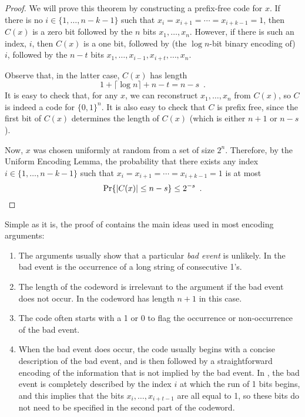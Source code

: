 \documentclass[lotsofwhite]{patmorin}
\begin{document}
\begin{proof}
  We will prove this theorem by constructing a prefix-free code
  for $x$. If there is no $i\in\{1,\ldots,n-k-1\}$ such that
  $x_i=x_{i+1}=\cdots=x_{i+k-1}=1$, then $C(x)$ is a zero bit
  followed by the $n$ bits $x_1,\ldots,x_n$.  However, if there is
  such an index, $i$, then $C(x)$ is a one bit, followed by (the
  $\log n$-bit binary encoding of) $i$, followed by the $n-t$ bits
  $x_1,\ldots,x_{i-1},x_{i+t},\ldots,x_n$.

  Observe that, in the latter case, $C(x)$ has length 
  \[
      1 + \lceil\log n\rceil + n - t = n-s \enspace .
  \]
  It is easy to check that, for any $x$, we can reconstruct
  $x_1,\ldots,x_n$ from $C(x)$, so $C$ is indeed a code for $\{0,1\}^n$.
  It is also easy to check that $C$ is prefix free, since the first bit of
  $C(x)$ determines the length of $C(x)$ (which is either $n+1$ or $n-s$).

  Now, $x$ was chosen uniformly at random from a set of size $2^{n}$.
  Therefore, by the Uniform Encoding Lemma, the probability
  that there exists any index $i\in\{1,\ldots,n-k-1\}$ such that
  $x_i=x_{i+1}=\cdots=x_{i+k-1}=1$ is at most
  \[
      \Pr\{|C(x)|\le n-s\} \le 2^{-s} \enspace . \qedhere 
  \]
\end{proof}

Simple as it is, the proof of  contains the main ideas
used in most encoding arguments:

\begin{enumerate}
  \item The arguments usually show that a particular \emph{bad event}
  is unlikely.  In  the bad event is the occurrence of a long
  string of consecutive 1's.

  \item The length of the codeword is irrelevant to the argument if
  the bad event does not occur.  In 
  the codeword has length $n+1$ in this case.
 
  \item The code often starts with a 1 or 0 to flag the occurrence or
  non-occurrence of the bad event.

  \item When the bad event does occur, the code usually begins with
  a concise description of the bad event, and is then followed by a
  straightforward encoding of the information that is not implied by the
  bad event. In , the bad event is completely described
  by the index $i$ at which the run of 1 bits begins, and this implies
  that the bits $x_i,\ldots,x_{i+t-1}$ are all equal to 1, so these
  bits do not need to be specified in the second part of the codeword. 
\end{enumerate}
\end{document}
